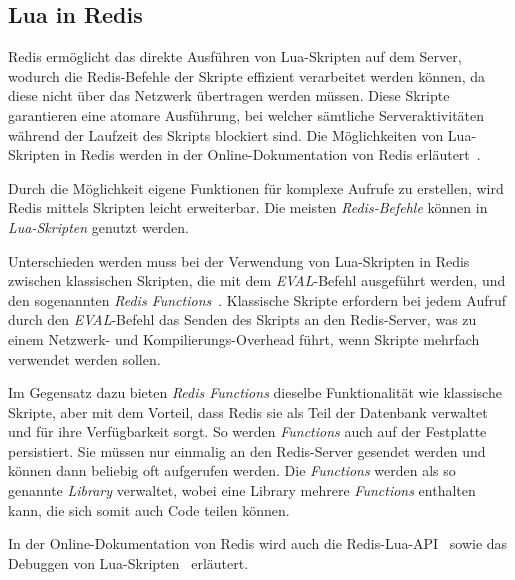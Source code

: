 \subsection{Lua in Redis}\label{sec:lua-in-redis}
Redis ermöglicht das direkte Ausführen von Lua-Skripten auf dem Server, wodurch die Redis-Befehle der Skripte effizient verarbeitet werden können, da diese nicht über das Netzwerk übertragen werden müssen. Diese Skripte garantieren eine atomare Ausführung, bei welcher sämtliche Serveraktivitäten während der Laufzeit des Skripts blockiert sind. Die Möglichkeiten von Lua-Skripten in Redis werden in der Online-Dokumentation von Redis erläutert~\cite{redis_ltd_scripting_nodate}.

Durch die Möglichkeit eigene Funktionen für komplexe Aufrufe zu erstellen, wird Redis mittels Skripten leicht erweiterbar. Die meisten \emph{Redis-Befehle} können in \emph{Lua-Skripten} genutzt werden.

Unterschieden werden muss bei der Verwendung von Lua-Skripten in Redis zwischen klassischen Skripten, die mit dem \emph{EVAL}-Befehl ausgeführt werden, und den sogenannten \emph{Redis Functions}~\cite{redis_ltd_redis_nodate-1}. Klassische Skripte erfordern bei jedem Aufruf durch den \emph{EVAL}-Befehl das Senden des Skripts an den Redis-Server, was zu einem Netzwerk- und Kompilierungs-Overhead führt, wenn Skripte mehrfach verwendet werden sollen.

Im Gegensatz dazu bieten \emph{Redis Functions} dieselbe Funktionalität wie klassische Skripte, aber mit dem Vorteil, dass Redis sie als Teil der Datenbank verwaltet und für ihre Verfügbarkeit sorgt.  So werden \emph{Functions} auch auf der Festplatte persistiert. Sie müssen nur einmalig an den Redis-Server gesendet werden und können dann beliebig oft aufgerufen werden. Die \emph{Functions} werden als so genannte \emph{Library} verwaltet, wobei eine Library mehrere \emph{Functions} enthalten kann, die sich somit auch Code teilen können.

In der Online-Dokumentation von Redis wird auch die Redis-Lua-API~\cite{redis_ltd_redis_nodate} sowie das Debuggen von Lua-Skripten~\cite{redis_ltd_debugging_nodate} erläutert.

